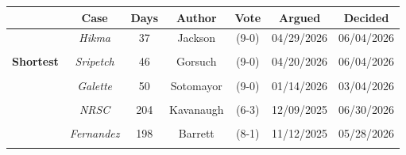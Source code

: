 \documentclass[
  12pt,
]{article}
\begin{document}
\begin{figure}[H]
\begin{minipage}[t]{0.7\textwidth}
 
\begin{tabular}[t]{>{}c>{}cccccc}
\toprule
\textbf{} & \textbf{Case} & \textbf{Days} & \textbf{Author} & \textbf{Vote} & \textbf{Argued} & \textbf{Decided}\\
\midrule
\textbf{} & \em{Hikma} & 37 & Jackson & (9-0) & 04/29/2026 & 06/04/2026\\
\textbf{\cellcolor[HTML]{F5F5F5}{}} & \em{\cellcolor[HTML]{F5F5F5}{AT\&T}} & \cellcolor[HTML]{F5F5F5}{45} & \cellcolor[HTML]{F5F5F5}{Roberts} & \cellcolor[HTML]{F5F5F5}{(8-1)} & \cellcolor[HTML]{F5F5F5}{04/21/2026} & \cellcolor[HTML]{F5F5F5}{06/04/2026}\\
\textbf{Shortest} & \em{Sripetch} & 46 & Gorsuch & (9-0) & 04/20/2026 & 06/04/2026\\
\textbf{\cellcolor[HTML]{F5F5F5}{}} & \em{\cellcolor[HTML]{F5F5F5}{Jules}} & \cellcolor[HTML]{F5F5F5}{46} & \cellcolor[HTML]{F5F5F5}{Sotomayor} & \cellcolor[HTML]{F5F5F5}{(9-0)} & \cellcolor[HTML]{F5F5F5}{03/30/2026} & \cellcolor[HTML]{F5F5F5}{05/14/2026}\\
\textbf{} & \em{Galette} & 50 & Sotomayor & (9-0) & 01/14/2026 & 03/04/2026\\
\midrule
\textbf{\cellcolor[HTML]{F5F5F5}{}} & \em{\cellcolor[HTML]{F5F5F5}{Landor}} & \cellcolor[HTML]{F5F5F5}{226} & \cellcolor[HTML]{F5F5F5}{Gorsuch} & \cellcolor[HTML]{F5F5F5}{(6-3)} & \cellcolor[HTML]{F5F5F5}{11/10/2025} & \cellcolor[HTML]{F5F5F5}{06/23/2026}\\
\textbf{} & \em{NRSC} & 204 & Kavanaugh & (6-3) & 12/09/2025 & 06/30/2026\\
\textbf{\cellcolor[HTML]{F5F5F5}{Longest}} & \em{\cellcolor[HTML]{F5F5F5}{Slaughter}} & \cellcolor[HTML]{F5F5F5}{204} & \cellcolor[HTML]{F5F5F5}{Roberts} & \cellcolor[HTML]{F5F5F5}{(6-3)} & \cellcolor[HTML]{F5F5F5}{12/08/2025} & \cellcolor[HTML]{F5F5F5}{06/29/2026}\\
\textbf{} & \em{Fernandez} & 198 & Barrett & (8-1) & 11/12/2025 & 05/28/2026\\
\textbf{\cellcolor[HTML]{F5F5F5}{}} & \em{\cellcolor[HTML]{F5F5F5}{Rutherford}} & \cellcolor[HTML]{F5F5F5}{198} & \cellcolor[HTML]{F5F5F5}{Barrett} & \cellcolor[HTML]{F5F5F5}{(6-3)} & \cellcolor[HTML]{F5F5F5}{11/12/2025} & \cellcolor[HTML]{F5F5F5}{05/28/2026}\\
\bottomrule
\end{tabular} 

\end{minipage}



\end{figure}
\end{document}
